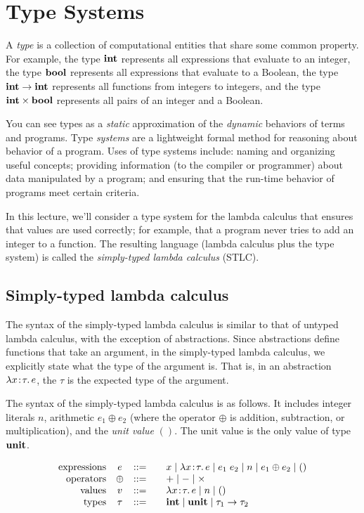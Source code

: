 % 
\chapter{Type Systems}
\noindent
A \emph{type} is a collection of computational entities that share some common property. For example, the type $\mathbf{int}$ represents all expressions that evaluate to an integer, the type $\mathbf{bool}$ represents all expressions that evaluate to a Boolean, the type $\mathbf{int} \to \mathbf{int}$ represents all functions from integers to integers, and the type $\mathbf{int} \times \mathbf{bool}$ represents all pairs of an integer and a Boolean.

You can see types as a \emph{static} approximation of the \emph{dynamic} behaviors of terms and programs. Type \emph{systems} are a lightweight formal method for reasoning about behavior of a program. Uses of type systems include: naming and organizing useful concepts; providing information (to the compiler or programmer) about data manipulated by a program; and ensuring that the run-time behavior of programs meet certain criteria.

In this lecture, we'll consider a type system for the lambda calculus that ensures that values are used correctly; for example, that a program never tries to add an integer to a function. The resulting language (lambda calculus plus the type system) is called the \emph{simply-typed lambda calculus} (STLC).

\section{Simply-typed lambda calculus}

The syntax of the simply-typed lambda calculus is similar to that of untyped lambda calculus, with the exception of abstractions. Since abstractions define functions that take an argument, in the simply-typed lambda calculus, we explicitly state what the type of the argument is. That is, in an abstraction $\lambda x\!:\!\tau.\, e$, the $\tau$ is the expected type of the argument.

The syntax of the simply-typed lambda calculus is as follows. It includes integer literals $n$, arithmetic $e_1 \oplus e_2$ (where the operator $\oplus$ is addition, subtraction, or multiplication), and the \emph{unit value} $()$. The unit value is the only value of type $\mathbf{unit}$.

\[
\begin{array}{rcl@{\qquad}l}
\text{expressions} & e & ::= & x \mid \lam{x}{\tau} e \mid e_1\; e_2 \mid n \mid e_1 \oplus e_2 \mid () \\
\text{operators} & \oplus & ::= & + \mid - \mid \times \\
\text{values} & v & ::= & \lam{x}{\tau} e \mid n \mid () \\
\text{types} & \tau & ::= & \tint \mid \tunit \mid \tau_1 \to \tau_2
\end{array}
\]

